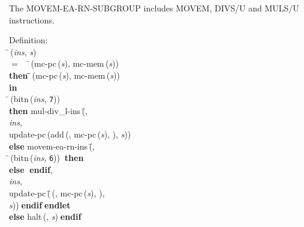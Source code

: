  The MOVEM-EA-RN-SUBGROUP includes MOVEM, DIVS/U and MULS/U instructions.
\begin{tabbing}{\sc Definition}: \\  
\=\,({\it{ins\/}}, {\it{s\/}}) \\ 
$=$$\;\;\;\;$\=\,({\rm{mc-pc}}\,({\it{s\/}}), {\rm{mc-mem}}\,({\it{s\/}})) \\ 
{\bf then }\=\=\,({\rm{mc-pc}}\,({\it{s\/}}), {\rm{mc-mem}}\,({\it{s\/}}))\- \\ 
{\bf in} \\ 
\=\,({\rm{bitn}}\,({\it{ins\/}}, {\tt{7}})) \\ 
{\bf then }{\rm{mul-div\_l-ins}}\,(\=, \\ 
{\it{ins\/}}, \\ 
{\rm{update-pc}}\,({\rm{add}}\,({}, {\rm{mc-pc}}\,({\it{s\/}}), {}), {\it{s\/}}))\- \\ 
{\bf else }{\rm{movem-ea-rn-ins}}\,(\=, \\ 
\=\,({\rm{bitn}}\,({\it{ins\/}}, {\tt{6}}))$\;\;${\bf then }{} \\ 
{\bf else }{}$\;${\bf  endif}\-, \\ 
{\it{ins\/}}, \\ 
{\rm{update-pc}}\,(\=\,({}, {\rm{mc-pc}}\,({\it{s\/}}), {}), \\ 
{\it{s\/}})\-)\-$\;${\bf  endif}\-$\;${\bf  endlet}\- \\ 
{\bf else }{\rm{halt}}\,({}, {\it{s\/}})$\;${\bf  endif}\-\-
\end{tabbing}

